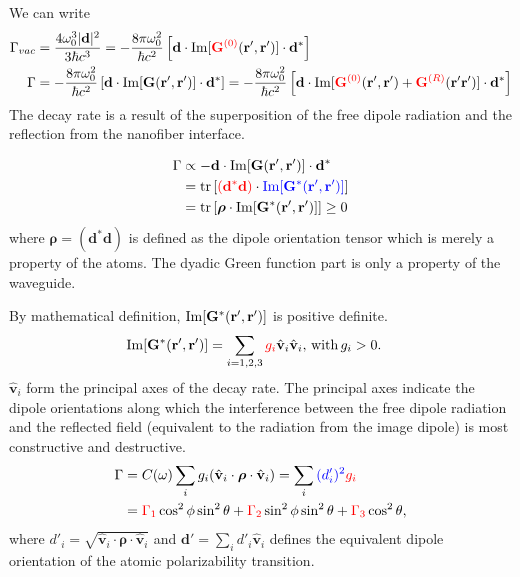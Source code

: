 \documentclass[preprint,aps,pra,onecolumn]{revtex4-1} %
\begin{document}
We can write 
\begin{align}
\Gamma_{vac} &= \frac{4\omega_0^3|\mathbf{d}|^2}{3\hbar c^3}=-\frac{8\pi \omega_0^2}{\hbar c^2}\left[ \mathbf{d}\cdot \mathrm{Im}[\mathbin{\color{red}{\mathbf{G}^{(0)}}}(\mathbf{r}',\mathbf{r}')]\cdot \mathbf{d}^* \right]\\
\Gamma &= -\frac{8\pi \omega_0^2}{\hbar c^2}\left[ \mathbf{d}\cdot \mathrm{Im}[\mathbf{G}(\mathbf{r}',\mathbf{r}')]\cdot \mathbf{d}^* \right]=-\frac{8\pi \omega_0^2}{\hbar c^2}\left[ \mathbf{d}\cdot \mathrm{Im}[\mathbin{\color{red}{\mathbf{G}^{(0)}}}(\mathbf{r}',\mathbf{r}')+\mathbin{\color{red}{\mathbf{G}^{(R)}}}(\mathbf{r}'\mathbf{r}')]\cdot \mathbf{d}^* \right]\\
\end{align}
The decay rate is a result of the superposition of the free dipole radiation and the reflection from the nanofiber interface.

\begin{align}
\Gamma &\propto -\mathbf{d}\cdot \mathrm{Im}[\mathbf{G}(\mathbf{r}',\mathbf{r}')]\cdot \mathbf{d}^* \\
&=\mathrm{tr}\left[ \mathbin{\color{red}{(\mathbf{d}^*\mathbf{d})}}\cdot\mathbin{\color{blue}{ \mathrm{Im}[\mathbf{G}^*(\mathbf{r}',\mathbf{r}')]}}  \right]\\
&= \mathrm{tr}\left[ \boldsymbol{\rho} \cdot \mathrm{Im}[\mathbf{G}^{*}(\mathbf{r}',\mathbf{r}')]  \right]\ge 0
\end{align}
where $\boldsymbol{\rho}=(\mathbf{d}^*\mathbf{d})$ is defined as the dipole orientation tensor which is merely a property of the atoms. The dyadic Green function part is only a property of the waveguide.  

By mathematical definition, $\mathrm{Im}[\mathbf{G}^{*}(\mathbf{r}',\mathbf{r}')]$ is positive definite. 
\begin{align}
\mathrm{Im}[\mathbf{G}^{*}(\mathbf{r}',\mathbf{r}')] &= \sum_{i=1,2,3} \mathbin{\color{red}{g_i}}\hat{\mathbf{v}}_i\hat{\mathbf{v}}_i,\,\text{with}\, g_i>0.
\end{align}
$\hat{\mathbf{v}}_i$ form the principal axes of the decay rate. The principal axes indicate the dipole orientations along which the interference between the free dipole radiation and the reflected field (equivalent to the radiation from the image dipole) is most constructive and destructive.   
\begin{align}
\Gamma &= C(\omega)\sum_i g_i(\hat{\mathbf{v}}_i\cdot \boldsymbol{\rho}\cdot \hat{\mathbf{v}}_i) 
= \sum_i \mathbin{\color{blue}{(d'_i)^2}} \mathbin{\color{red}{g_i}} \\
&= \mathbin{\color{red}{\Gamma_1}}\cos^2\phi\sin^2\theta+\mathbin{\color{red}{\Gamma_2}}\sin^2\phi\sin^2\theta+\mathbin{\color{red}{\Gamma_3}}\cos^2\theta,
\end{align}
where $ d'_i=\sqrt{\hat{\mathbf{v}}_i\cdot \boldsymbol{\rho}\cdot \hat{\mathbf{v}}_i}$ and $\mathbf{d}'=\sum_i d'_i\hat{\mathbf{v}}_i$ defines the equivalent dipole orientation of the atomic polarizability transition.
\end{document}
